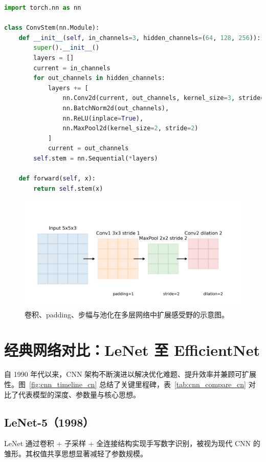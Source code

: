 ﻿\documentclass[UTF8,zihao=-4]{ctexart}
\begin{document}
\begin{lstlisting}[language=Python, caption={带归一化与池化的 PyTorch 卷积 stem 模块。}]
import torch.nn as nn

class ConvStem(nn.Module):
    def __init__(self, in_channels=3, hidden_channels=(64, 128, 256)):
        super().__init__()
        layers = []
        current = in_channels
        for out_channels in hidden_channels:
            layers += [
                nn.Conv2d(current, out_channels, kernel_size=3, stride=1, padding=1, bias=False),
                nn.BatchNorm2d(out_channels),
                nn.ReLU(inplace=True),
                nn.MaxPool2d(kernel_size=2, stride=2)
            ]
            current = out_channels
        self.stem = nn.Sequential(*layers)

    def forward(self, x):
        return self.stem(x)
\end{lstlisting}

\begin{figure}[H]
  \centering
  \includegraphics[width=0.85\linewidth]{cnn_structure_receptive_field.png}
  \caption{卷积、padding、步幅与池化在多层网络中扩展感受野的示意图。}
  \label{fig:cnn_structure_cn}
\end{figure}
\FloatBarrier

\section{经典网络对比：LeNet 至 EfficientNet}
自 1990 年代以来，CNN 架构不断演进以解决优化难题、提升效率并兼顾可扩展性。图~\ref{fig:cnn_timeline_cn} 总结了关键里程碑，表~\ref{tab:cnn_compare_cn} 对比了代表模型的深度、参数量与核心思想。

\subsection{LeNet-5（1998）}
LeNet 通过卷积 + 子采样 + 全连接结构实现手写数字识别，被视为现代 CNN 的雏形。其权值共享思想显著减轻了参数规模。
\end{document}
